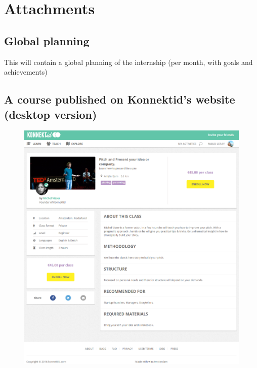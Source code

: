 \section{Attachments}
\label{sec:attach}

\subsection{Global planning}
\label{ssec:planning}

This will contain a global planning of the internship (per month, with goals and achievements)

\newpage

\subsection{A course published on Konnektid's website (desktop version)}
\label{ssec:courseDesktop}

\begin{figure}[H]
    \centering
    \includegraphics[scale=0.6]{figure/coursePage.png}
\end{figure}
